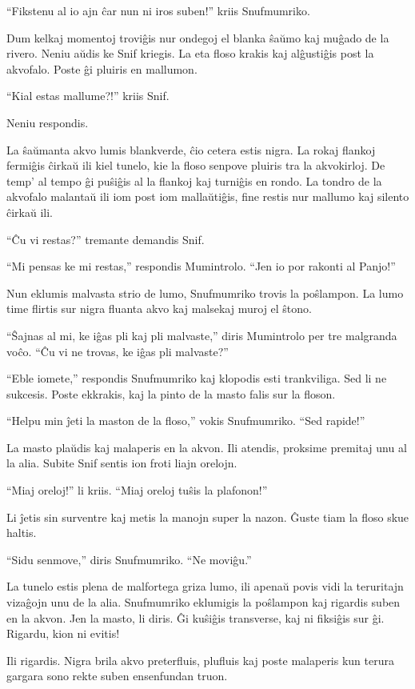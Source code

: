 ``Fikstenu al io ajn ĉar nun ni iros suben!'' kriis Snufmumriko.

Dum kelkaj momentoj troviĝis nur ondegoj el blanka ŝaŭmo kaj muĝado de la rivero. Neniu aŭdis ke Snif kriegis. La eta floso krakis kaj alĝustiĝis post la akvofalo. Poste ĝi pluiris en mallumon.

``Kial estas mallume?!'' kriis Snif.

Neniu respondis.

La ŝaŭmanta akvo lumis blankverde, ĉio cetera estis nigra. La rokaj flankoj fermiĝis ĉirkaŭ ili kiel tunelo, kie la floso senpove pluiris tra la akvokirloj. De temp' al tempo ĝi puŝiĝis al la flankoj kaj turniĝis en rondo. La tondro de la akvofalo malantaŭ ili iom post iom mallaŭtiĝis, fine restis nur mallumo kaj silento ĉirkaŭ ili.

``Ĉu vi restas?'' tremante demandis Snif.

``Mi pensas ke mi restas,'' respondis Mumintrolo. ``Jen io por rakonti al Panjo!''

Nun eklumis malvasta strio de lumo, Snufmumriko trovis la poŝlampon. La lumo time flirtis sur nigra fluanta akvo kaj malsekaj muroj el ŝtono.

``Ŝajnas al mi, ke iĝas pli kaj pli malvaste,'' diris Mumintrolo per tre malgranda voĉo. ``Ĉu vi ne trovas, ke iĝas pli malvaste?''

``Eble iomete,'' respondis Snufmumriko kaj klopodis esti trankviliga. Sed li ne sukcesis. Poste ekkrakis, kaj la pinto de la masto falis sur la floson.

``Helpu min ĵeti la maston de la floso,'' vokis Snufmumriko. ``Sed rapide!''

La masto plaŭdis kaj malaperis en la akvon. Ili atendis, proksime premitaj unu al la alia. Subite Snif sentis ion froti liajn orelojn.

``Miaj oreloj!'' li kriis. ``Miaj oreloj tuŝis la plafonon!''

Li ĵetis sin surventre kaj metis la manojn super la nazon. Ĝuste tiam la floso skue haltis.

``Sidu senmove,'' diris Snufmumriko. ``Ne moviĝu.''

La tunelo estis plena de malfortega griza lumo, ili apenaŭ povis vidi la teruritajn vizaĝojn unu de la alia. Snufmumriko eklumigis la poŝlampon kaj rigardis suben en la akvon. Jen la masto, li diris. Ĝi kuŝiĝis transverse, kaj ni fiksiĝis sur ĝi. Rigardu, kion ni evitis!

Ili rigardis. Nigra brila akvo preterfluis, plufluis kaj poste malaperis kun terura gargara sono rekte suben ensenfundan truon.

